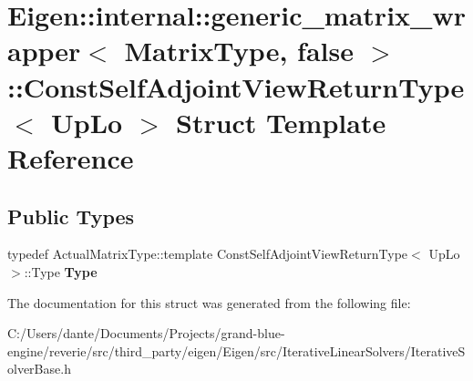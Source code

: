\hypertarget{struct_eigen_1_1internal_1_1generic__matrix__wrapper_3_01_matrix_type_00_01false_01_4_1_1_const_self_adjoint_view_return_type}{}\section{Eigen\+::internal\+::generic\+\_\+matrix\+\_\+wrapper$<$ Matrix\+Type, false $>$\+::Const\+Self\+Adjoint\+View\+Return\+Type$<$ Up\+Lo $>$ Struct Template Reference}
\label{struct_eigen_1_1internal_1_1generic__matrix__wrapper_3_01_matrix_type_00_01false_01_4_1_1_const_self_adjoint_view_return_type}
\subsection*{Public Types}
\begin{DoxyCompactItemize}
\item 
\mbox{\label{struct_eigen_1_1internal_1_1generic__matrix__wrapper_3_01_matrix_type_00_01false_01_4_1_1_const_self_adjoint_view_return_type_a58add0965fe42d8fa8c17f322b6cbc4e}} 
typedef Actual\+Matrix\+Type\+::template Const\+Self\+Adjoint\+View\+Return\+Type$<$ Up\+Lo $>$\+::Type {\bfseries Type}
\end{DoxyCompactItemize}


The documentation for this struct was generated from the following file\+:\begin{DoxyCompactItemize}
\item 
C\+:/\+Users/dante/\+Documents/\+Projects/grand-\/blue-\/engine/reverie/src/third\+\_\+party/eigen/\+Eigen/src/\+Iterative\+Linear\+Solvers/Iterative\+Solver\+Base.\+h\end{DoxyCompactItemize}
